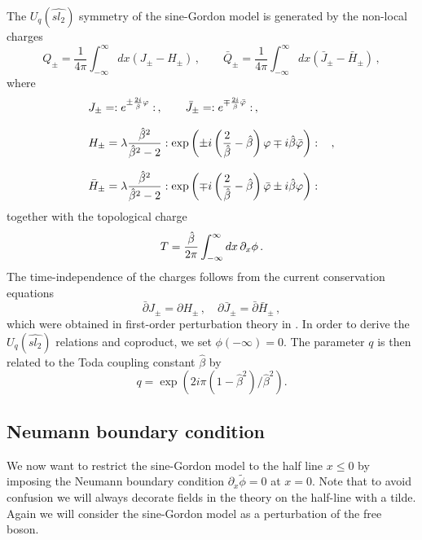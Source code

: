 \documentclass[a4paper,12pt]{article}
\newcommand{\hb}{\hat{\beta}}
\numberwithin{equation}{section}
\begin{document}
The $U_q(\hat{sl_2})$ symmetry of the sine-Gordon model is
generated by the non-local charges \cite{Ber91}
\begin{equation}
  Q_\pm = \frac{1}{4\pi} \int_{-\infty}^\infty
  dx(J_\pm-H_\pm)\,,\qquad \bar{Q}_\pm = \frac{1}{4\pi}
  \int_{-\infty}^\infty dx ( \bar{J}_\pm-\bar{H}_\pm)\,,
\end{equation}
where
\begin{eqnarray}
  &J_\pm = : e^{\pm \frac{2i}{\hb}\varphi}:\,,
  \qquad\bar{J}_\pm = : e^{\mp
  \frac{2i}{\hb}\bar{\varphi}}:\,,&\\[0.1in]& H_\pm =\lambda
  {\hb^2\over \hb^2-2} : \exp\left( \pm i
  \left({2\over\hb}-\hb\right)\varphi \mp
  i\hb\bar{\varphi}\right):&\,,\\[0.1in]
  &\bar{H}_\pm =\lambda {\hb^2\over \hb^2-2} : \exp\left( \mp i
  \left({2\over\hb}-\hb\right)\bar{\varphi} \pm
  i\hb\varphi\right):&\,
\end{eqnarray}
together with the topological charge
\begin{equation}
  T = {\hb\over 2\pi}
 \int_{-\infty}^\infty dx\,\partial_x \phi\,.
\end{equation}
The time-independence of the charges follows from the current
conservation equations \begin{equation} \bar{\partial} J_\pm=
\partial H_\pm\,,\quad \partial\bar{J}_\pm =
\bar{\partial}\bar{H}_\pm\,,\end{equation} which were obtained in
first-order perturbation theory in \cite{Ber91}. In order to
derive the $U_q(\hat{sl_2})$ relations and coproduct, we set
$\phi(-\infty)=0$. The parameter $q$ is then related to the Toda
coupling constant $\hb$ by
\begin{equation}\label{q}
  q=\exp\left(2i\pi(1-\hb^2)/\hb^2\right).
\end{equation}



\subsection{Neumann boundary condition\label{sectnbc}}

We now want to restrict the sine-Gordon model to the half line
$x\leq 0$ by imposing the Neumann boundary condition
$\partial_x\tilde{\phi}=0$ at $x=0$. Note that to avoid confusion
we will always decorate fields in the theory on the half-line with
a tilde. Again we will consider the sine-Gordon model as a
perturbation of the free boson.
\end{document}
